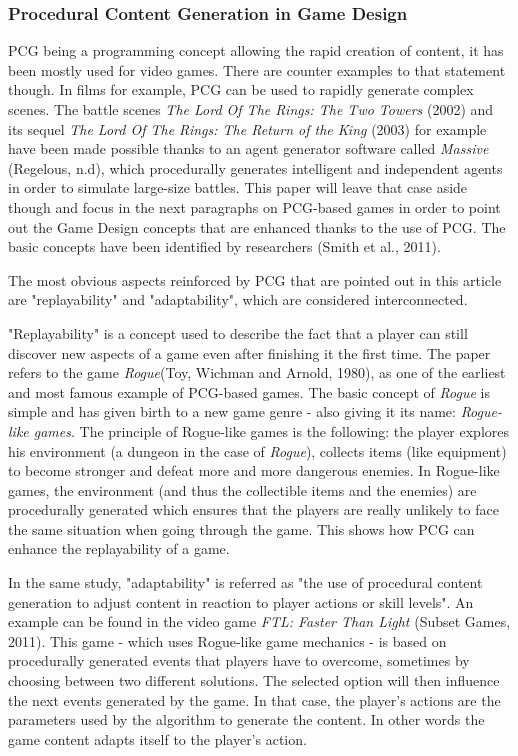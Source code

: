 \subsubsection{Procedural Content Generation in Game Design}
PCG being a programming concept allowing the rapid creation of content, it has been mostly used for video games. There are counter examples to that statement though. In films for example, PCG can be used to rapidly generate complex scenes. The battle scenes \textit{The Lord Of The Rings: The Two Towers} (2002)\cite{film:lotr2} and its sequel \textit{The Lord Of The Rings: The Return of the King} (2003)\cite{film:lotr3} for example have been made possible thanks to an agent generator software called \textit{Massive} (Regelous, n.d)\cite{soft:massive}, which procedurally generates intelligent and independent agents in order to simulate large-size battles. This paper will leave that case aside though and focus in the next paragraphs on PCG-based games in order to point out the Game Design concepts that are enhanced thanks to the use of PCG. The basic concepts have been identified by researchers (Smith et al., 2011)\cite{art:pcgbased}.

The most obvious aspects reinforced by PCG that are pointed out in this article are "replayability" and "adaptability", which are considered interconnected.

"Replayability" is a concept used to describe the fact that a player can still discover new aspects of a game even after finishing it the first time. The paper refers to the game \textit{Rogue}(Toy, Wichman and Arnold, 1980)\cite{game:rogue}, as one of the earliest and most famous example of PCG-based games. The basic concept of \textit{Rogue} is simple and has given birth to a new game genre - also giving it its name: \textit{Rogue-like games}. The principle of Rogue-like games is the following: the player explores his environment (a dungeon in the case of \textit{Rogue}), collects items (like equipment) to become stronger and defeat more and more dangerous enemies. In Rogue-like games, the environment (and thus the collectible items and the enemies) are procedurally generated which ensures that the players are really unlikely to face the same situation when going through the game. This shows how PCG can enhance the replayability of a game.

In the same study, "adaptability" is referred as "the use of procedural content generation to adjust content in reaction to player actions or skill levels". An example can be found in the video game \textit{FTL: Faster Than Light} (Subset Games, 2011)\cite{game:FTL}. This game - which uses Rogue-like game mechanics - is based on procedurally generated events that players   have to overcome, sometimes by choosing between two different solutions. The selected option will then influence the next events generated by the game. In that case, the player's actions are the parameters used by the algorithm to generate the content. In other words the game content adapts itself to the player's action.

